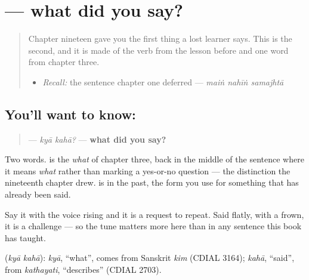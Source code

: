 \section[\texorpdfstring{\ur{کیا} \ur{کہا؟} (kyā kahā?)}{کیا کہا؟ (kyā kahā?)}]{  — what did you say?}

\label{lesson:UR-C22-kya-kaha}



\begin{quote}
Chapter nineteen gave you the first thing a lost learner says. This is the second, and it is made of the verb from the lesson before and one word from chapter three.

\begin{itemize}
\raggedright
  \item \emph{Recall:} the sentence chapter one deferred — \emph{maiṅ nahīṅ samajhtā}
\end{itemize}
\end{quote}

\subsection*{You'll want to know:  }
\begin{quote}
\textbf{ } — \emph{kyā kahā?} — \textbf{what did you say?}
\end{quote}

Two words. \textbf{} is the \emph{what} of chapter three, back in the middle of the sentence where it means \emph{what} rather than marking a yes-or-no question — the distinction the nineteenth chapter drew. \textbf{} is \textbf{} in the past, the form you use for something that has already been said.

Say it with the voice rising and it is a request to repeat. Said flatly, with a frown, it is a challenge — so the tune matters more here than in any sentence this book has taught.

\begin{cousinweb}
\textbf{ } (\emph{kyā kahā}): \emph{kyā}, \textquotedblleft{}what\textquotedblright{}, comes from Sanskrit \emph{kim} (CDIAL 3164); \emph{kahā}, \textquotedblleft{}said\textquotedblright{}, from \emph{kathayati}, \textquotedblleft{}describes\textquotedblright{} (CDIAL 2703).
\end{cousinweb}

